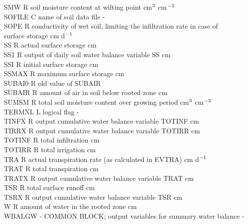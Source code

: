 \documentclass[11pt]{article}
\begin{document}
\begin{tabbing}
SMW\> \> R\> soil moisture content at wilting point\> \> \> \> \> \> \> cm$^{{\rm 3}}$ cm$^{{\rm -3}}$\\
SOFILE\> \> C\> name of soil data file\> \> \> \> \> \> \> -\\
SOPE\> \> R\> conductivity of wet soil, limiting the infiltration rate in case of \\
\>\> \> surface storage \> \> \> \> \> \> \> cm d$^{{\rm -1}}$\\
SS\> \> R\> actual surface storage\> \> \> \> \> \> \> cm\\
SS1\> \> R\> output of daily soil water balance variable SS\> \> \> \> \> \> \> cm\\
SSI\> \> R\> initial surface storage\> \> \> \> \> \> \> cm\\
SSMAX\> \> R\> maximum surface storage\> \> \> \> \> \> \> cm\\
SUBAI0\> \> R\> old value of SUBAIR\\
SUBAIR\> \> R\> amount of air in soil below rooted zone\> \> \> \> \> \> \> cm\\
SUMSM\> \> R\> total soil moisture content over growing period \> \> \> \> \> \> \> cm$^{{\rm 3}}$ cm$^{{\rm -3}}$\\
TERMNL\> \> L\> logical flag\> \> \> \> \> \> \> -\\
TINFX\> \> R\> output cumulative water balance variable TOTINF\> \> \> \> \> \> \> cm\\
TIRRX\> \> R\> output cumulative water balance variable TOTIRR\> \> \> \> \> \> \> cm\\
TOTINF\> \> R\> total infiltration\> \> \> \> \> \> \> cm\\
TOTIRR\> \> R\> total irrigation\> \> \> \> \> \> \> cm\\
TRA\> \> R\> actual transpiration rate (as calculated in EVTRA)\> \> \> \> \> \> \> cm d$^{{\rm -1}}$\\
TRAT\> \> R\> total transpiration\> \> \> \> \> \> \> cm\\
TRATX\> \> R\> output cumulative water balance variable TRAT\> \> \> \> \> \> \> cm\\
TSR\> \> R\> total surface runoff\> \> \> \> \> \> \> cm\\
TSRX\> \> R\> output cumulative water balance variable TSR\> \> \> \> \> \> \> cm\\
W\> \> R\> amount of water in the rooted zone\> \> \> \> \> \> \> cm\\
WBALGW\> \> -\> COMMON BLOCK; output variables for summary water balance\> \> \> \> \> \> \> -\\

\end{tabbing}
\end{document}
